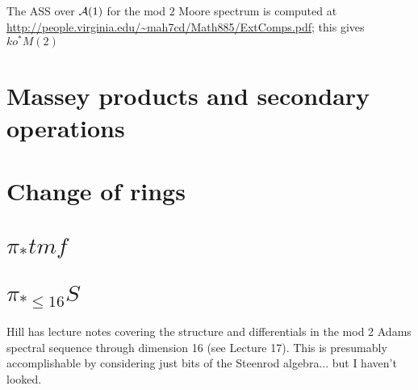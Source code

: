 The ASS over $\mathcal{A}(1)$ for the mod $2$ Moore spectrum is computed at \url{http://people.virginia.edu/~mah7cd/Math885/ExtComps.pdf}; this gives $ko^* M(2)$

\section{Massey products and secondary operations}

\section{Change of rings}

\section{$\pi_* tmf$}

\section{$\pi_{* \le 16} S$}

Hill has lecture notes covering the structure and differentials in the mod 2 Adams spectral sequence through dimension 16 (see Lecture 17).  This is presumably accomplishable by considering just bits of the Steenrod algebra... but I haven't looked.
